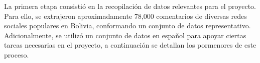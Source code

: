 La primera etapa consistió en la recopilación de datos relevantes para el proyecto. Para ello, se extrajeron aproximadamente 78,000 comentarios de diversas redes sociales populares en Bolivia, conformando un conjunto de datos representativo. Adicionalmente, se utilizó un conjunto de datos en español para apoyar ciertas tareas necesarias en el proyecto, a continuación se detallan los pormenores de este proceso.
